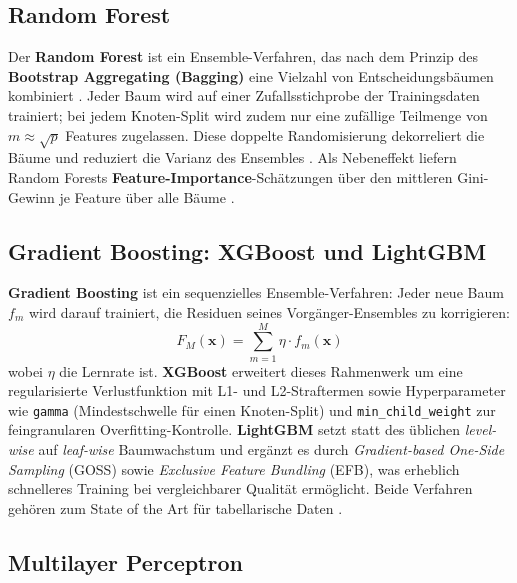 \subsection{Random Forest}
\label{sec:random-forest}

Der \textbf{Random Forest} ist ein Ensemble-Verfahren, das nach dem
Prinzip des \textbf{Bootstrap Aggregating (Bagging)} eine Vielzahl von
Entscheidungsbäumen kombiniert \cite{Breiman2001}. Jeder Baum wird auf
einer Zufallsstichprobe der Trainingsdaten trainiert; bei jedem
Knoten-Split wird zudem nur eine zufällige Teilmenge von $m \approx \sqrt{p}$
Features zugelassen. Diese doppelte Randomisierung dekorreliert die Bäume
und reduziert die Varianz des Ensembles \cite{JamesEtAl2021}. Als
Nebeneffekt liefern Random Forests \textbf{Feature-Importance}-Schätzungen
über den mittleren Gini-Gewinn je Feature über alle Bäume
\cite{Breiman2001,LundbergLee2017}.

\subsection{Gradient Boosting: XGBoost und LightGBM}
\label{sec:gradient-boosting}

\textbf{Gradient Boosting} \cite{Friedman2001} ist ein sequenzielles
Ensemble-Verfahren: Jeder neue Baum $f_m$ wird darauf trainiert, die
Residuen seines Vorgänger-Ensembles zu korrigieren:
\begin{equation}
    F_M(\mathbf{x}) = \sum_{m=1}^{M} \eta \cdot f_m(\mathbf{x})
\end{equation}
wobei $\eta$ die Lernrate ist. \textbf{XGBoost} \cite{ChenGuestrin2016}
erweitert dieses Rahmenwerk um eine regularisierte Verlustfunktion mit
L1- und L2-Straftermen sowie Hyperparameter wie \texttt{gamma}
(Mindestschwelle für einen Knoten-Split) und \texttt{min\_child\_weight}
zur feingranularen Overfitting-Kontrolle. \textbf{LightGBM}
\cite{KeEtAl2017} setzt statt des üblichen \textit{level-wise} auf
\textit{leaf-wise} Baumwachstum und ergänzt es durch
\textit{Gradient-based One-Side Sampling} (GOSS) sowie
\textit{Exclusive Feature Bundling} (EFB), was erheblich schnelleres
Training bei vergleichbarer Qualität ermöglicht. Beide Verfahren gehören
zum State of the Art für tabellarische Daten
\cite{GrollLeyEffenberger2019,HubacekSourekZelezny2019}.

\subsection{Multilayer Perceptron}
\label{sec:mlp}

